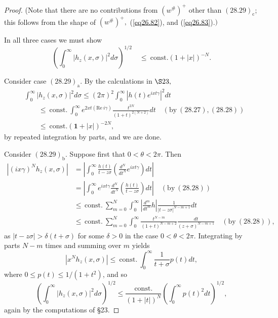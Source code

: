 \documentclass{surv-l}
\theoremstyle{plain}
\theoremstyle{definition}
\numberwithin{equation}{chapter}
\begin{document}
\begin{proof}
(Note that there are no contributions from $(w^{\#})^{+}$ other than $(28.29)_{\mathrm{c}}$; this follows from the shape of $(w^{\#})^{+},$ (\ref{eq26.82}), and (\ref{eq26.83}).$)$

In all three cases we must show
\setcounter{equation}{29}
\begin{equation}\label{eq28.30}
\left(\int_{0}^{\infty}|h_{z}(x, \sigma)|^{2}d\sigma\right)^{1/2}\quad\leq\ \mathrm{const}. (1+|x|)^{-N}.
\end{equation}

Consider case $(28.29)_{\mathrm{a}}$. By the calculations in $\S 23,$
\begin{align*}
&\int_{0}^{\infty}|h_{z}(x, \sigma)|^{2}d\sigma\leq(2\pi)^{2}\int_{0}^{\infty}|h(t)e^{ixt\gamma}|^{2}dt\\
&\qquad\leq\ \mathrm{const.}\ \int_{0}^{\infty}e^{2xt(\mathrm{Re}\ i\gamma)}\frac{t^{2N}}{(1+t)^{2(N+2)}}dt\quad (\mathrm{by}\ (28.27), (28.28))\\
&\qquad\leq\ \mathrm{const.}(\mathbf{1}+|x|)^{-2N},                                                                               \end{align*}
by repeated integration by parts, and we are done.

Consider $(28.29)_{\mathrm{b}}$. Suppose first that $ 0<\theta<2\pi$. Then
\begin{align*}
|(ix \gamma)^{N}h_{z}(x,\sigma)|&=\left|\int_{0}^{\infty}\frac{h(t)}{t-z\sigma}\left(\frac{d^{N}}{dt^{N}}e^{ixt\gamma}\right)dt\right|\\
&=\left|\int_{0}^{\infty}e^{ixt\gamma}\frac{d^{N}}{dt^{N}}\left(\frac{h(t)}{t-z\sigma}\right)dt\right|\quad (\mathrm{by}\ (28.28))\\
&\leq\,\mathrm{const}.\ \sum_{m=0}^{N}\int_{0}^{\infty}\left|\frac{d^{m}}{dt^{m}}h\right|\frac{1}{|t-z\sigma|^{N-m+1}}dt\\
&\leq\,\mathrm{const}.\ \sum_{m=0}^{N}\int_{0}^{\infty}\frac{t^{N-m}}{(1+t)^{N-m+2}}\frac{dt}{(z+\sigma)^{N-m+1}}\quad (\mathrm{by}\ (28.28)),
\end{align*}
as $|t-z\sigma|>\delta(t+\sigma)$ for some $\delta >0$ in the case $ 0<\theta<2\pi$. Integrating by parts $N-m$ times and summing over $m$ yields
\begin{equation*}
|x^{N}h_{z}(x,\sigma)|\leq\ \mathrm{const}.\ \int_{0}^{\infty}\frac{1}{t+\sigma}p(t) dt,
\end{equation*}
where $0\leq p(t)\leq 1/(1+t^{2})$, and so
\begin{equation*}
\left(\int_{0}^{\infty}|h_{z}(x, \sigma)|^{2}d\sigma\right)^{1/2}\leq\frac{\mathrm{const.}}{(1+|t|)^{N}}\left(\int_{0}^{\infty}p(t)^{2}dt\right)^{1/2},
\end{equation*}
again by the computations of \S 23.


\end{proof}
\end{document}

